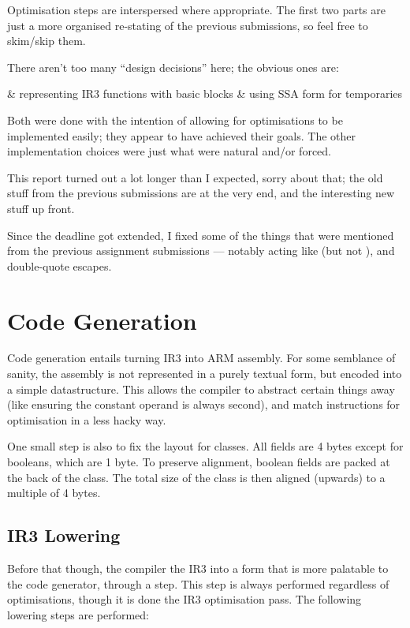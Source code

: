 \documentclass[12pt]{article}
\begin{document}
Optimisation steps are interspersed where appropriate. The first two parts are just a more organised re-stating of
the previous submissions, so feel free to skim/skip them.

There aren't too many \enquote{design decisions} here; the obvious ones are:

\begin{romanlist2}
& representing IR3 functions with basic blocks
& using SSA form for temporaries
\end{romanlist2}

Both were done with the intention of allowing for optimisations to be implemented easily; they appear to have
achieved their goals. The other implementation choices were just what were natural and/or forced.

This report turned out a lot longer than I expected, sorry about that; the old stuff from the previous submissions
are at the very end, and the interesting new stuff up front.

Since the deadline got extended, I fixed some of the things that were mentioned from the previous assignment
submissions --- notably  acting like  (but not ), and double-quote escapes.


\section{Code Generation}

Code generation entails turning IR3 into ARM assembly. For some semblance of sanity, the assembly is not represented
in a purely textual form, but encoded into a simple datastructure. This allows the compiler to abstract certain
things away (like ensuring the constant operand is always second), and match instructions for optimisation in a less
hacky way.

One small step is also to fix the layout for classes. All fields are 4 bytes except for booleans, which are 1 byte.
To preserve alignment, boolean fields are packed at the back of the class. The total size of the class is then
aligned (upwards) to a multiple of 4 bytes.

\subsection{IR3 Lowering}

Before that though, the compiler  the IR3 into a form that is more palatable to the code generator,
through a  step. This step is always performed regardless of optimisations, though it is done 
the IR3 optimisation pass. The following lowering steps are performed:
\end{document}
